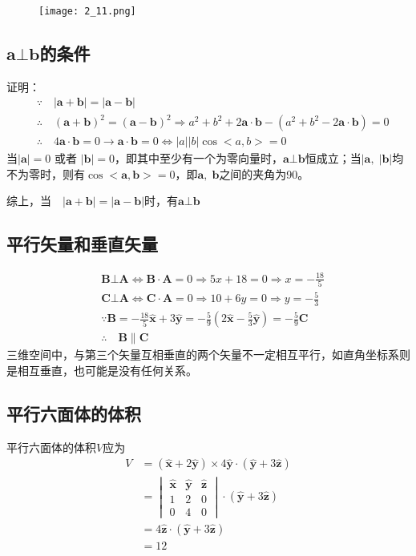 \begin{figure}[htbp]
	\centering
	\texttt{[image: 2\_11.png]}
	\caption{}
	\label{2_11}
\end{figure}
\subsection{$\bm{a}\bot \bm{b}$的条件}
证明：
\[
\begin{aligned}
&\because \quad |\bm{a} + \bm{b}| = |\bm{a} - \bm{b}| \\
&\therefore \quad (\bm{a} + \bm{b})^2 = (\bm{a} - \bm{b})^2 \Rightarrow a^2 + b^2 + 2\bm{a}\cdot\bm{b} - (a^2 + b^2 - 2\bm{a}\cdot\bm{b}) = 0 \\
&\therefore \quad 4\bm{a}\cdot\bm{b} = 0 \rightarrow \bm{a}\cdot\bm{b} = 0 \Leftrightarrow  |a| |b|\cos<a,b> = 0
\end{aligned}
\]
当$ |\bm{a}|=0$ 或者 $|\bm{b}|=0 $，即其中至少有一个为零向量时，$ \bm{a} \bot \bm{b} $恒成立；当$|\bm{a},\;|\bm{b}|$均不为零时，则有$\cos<\bm{a},\bm{b}>=0$，即$\bm{a},\;\bm{b}$之间的夹角为90\degree。

综上，当$\quad |\bm{a} + \bm{b}| = |\bm{a} - \bm{b}|$时，有$\bm{a}\bot \bm{b}$
\subsection{平行矢量和垂直矢量}
\[
\begin{aligned}
&\bm{B}\bot\bm{A} \Leftrightarrow \bm{B} \cdot \bm{A} = 0  \Rightarrow 5x + 18 = 0 \Rightarrow x = -\frac{18}{5} \\
&\bm{C}\bot\bm{A} \Leftrightarrow \bm{C} \cdot \bm{A} = 0 \Rightarrow 10 + 6y = 0 \Rightarrow y = -\frac{5}{3} \\
&\because \bm{B} = -\frac{18}{5}\bm{\hat{x}} + 3\bm{\hat{y}} = -\frac{5}{9}(2\bm{\hat{x}} - \frac{5}{3}\bm{\hat{y}}) = -\frac{5}{9}\bm{C} \\
&\therefore \quad \bm{B} \parallel \bm{C}
\end{aligned}
\]
三维空间中，与第三个矢量互相垂直的两个矢量不一定相互平行，如直角坐标系则是相互垂直，也可能是没有任何关系。
\subsection{平行六面体的体积}
平行六面体的体积$V$应为
\[
\begin{aligned}
V
& = (\bm{\hat{x}} + 2\bm{\hat{y}})\times4\bm{\hat{y}} \cdot (\bm{\hat{y}} + 3\bm{\hat{z}}) \\
& =
\begin{vmatrix}
\bm{\hat{x}} & \bm{\hat{y}} & \bm{\hat{z}} \\
1 & 2 & 0 \\
0 & 4 & 0
\end{vmatrix}
\cdot  (\bm{\hat{y}} + 3\bm{\hat{z}}) \\
& = 4\bm{\hat{z}} \cdot (\bm{\hat{y}} + 3\bm{\hat{z}}) \\
& = 12
\end{aligned}
\]
